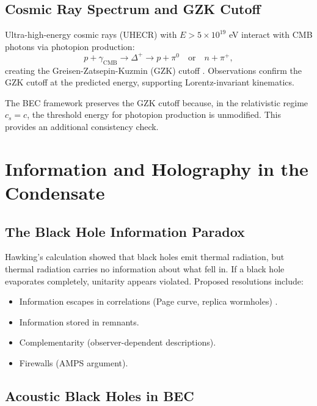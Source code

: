 \documentclass[11pt,a4paper]{article}
\newcommand{\cs}{\ensuremath{c_s}}
\theoremstyle{definition}
\theoremstyle{remark}
\begin{document}
\subsection{Cosmic Ray Spectrum and GZK Cutoff}
\label{sec:grb_cutoff}

Ultra-high-energy cosmic rays (UHECR) with $E > 5 \times 10^{19}$ eV interact with CMB photons via photopion production:
\begin{equation}
p + \gamma_{\mathrm{CMB}} \to \Delta^+ \to p + \pi^0 \quad \text{or} \quad n + \pi^+,
\end{equation}
creating the Greisen-Zatsepin-Kuzmin (GZK) cutoff \cite{Greisen1966,Pierre2008}. Observations confirm the GZK cutoff at the predicted energy, supporting Lorentz-invariant kinematics.

The BEC framework preserves the GZK cutoff because, in the relativistic regime $\cs = c$, the threshold energy for photopion production is unmodified. This provides an additional consistency check.

\section{Information and Holography in the Condensate}
\label{sec:information_holography}

\subsection{The Black Hole Information Paradox}
\label{sec:info_paradox}

Hawking's calculation \cite{Hawking1976} showed that black holes emit thermal radiation, but thermal radiation carries no information about what fell in. If a black hole evaporates completely, unitarity appears violated. Proposed resolutions include:
\begin{itemize}
\item Information escapes in correlations (Page curve, replica wormholes) \cite{Page1993,Almheiri2021}.
\item Information stored in remnants.
\item Complementarity (observer-dependent descriptions).
\item Firewalls (AMPS argument).
\end{itemize}

\subsection{Acoustic Black Holes in BEC}
\label{sec:acoustic_bh}
\end{document}
